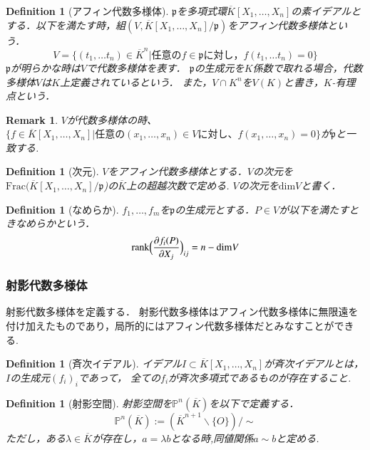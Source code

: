 \documentclass{ujarticle}
\newtheorem{dfn}[thm]{Definition}
\newtheorem*{rem}{Remark}
\begin{document}
\begin{dfn}[アフィン代数多様体]
$\mathfrak{p}$を多項式環$\overline{K}[X_1,\dots,X_n]$の素イデアルとする．以下を満たす時，組$(V,\overline{K}[X_1,\dots,X_n]/\mathfrak{p})$をアフィン代数多様体という．
\begin{equation*}
  V = \{ (t_1, \dots t_n) \in {\overline{K}}^n | \mbox{任意の}f \in \mathfrak{p} \mbox{に対し，}f(t_1, \dots t_n)=0 \}
\end{equation*}
$\mathfrak{p}$が明らかな時は$V$で代数多様体を表す．
$\mathfrak{p}$の生成元を$K$係数で取れる場合，代数多様体$V$は$K$上定義されているという．
また，$V \cap K^n$を$V(K)$と書き，$K$-有理点という．
\end{dfn}
\begin{rem}
 $V$が代数多様体の時、$\{f \in \overline{K}[X_1,\dots,X_n] |
 \mbox{任意の}(x_1,\dots,x_n) \in V \mbox{に対し、}
 f(x_1,\dots,x_n)=0 \}$が$\mathfrak{p}$と一致する.
\end{rem}

\begin{dfn}[次元]
$V$をアフィン代数多様体とする．$V$の次元を
$\mathrm{Frac}(\overline{K}[X_1,\dots,X_n]/\mathfrak{p}$)の$\overline{K}$上の超越次数で定める.
$V$の次元を$\mathrm{dim}V$と書く．
\end{dfn}

\begin{dfn}[なめらか]
  $f_1,\dots,f_m$を$\mathfrak{p}$の生成元とする．$P \in V$が以下を満たすときなめらかという．
  \begin{equation*}
    \mathrm{rank}\Bigl(\frac{ \partial f_i(P)}{ \partial X_j} \Bigr)_{ij} = n - \mathrm{dim}V
  \end{equation*}
\end{dfn}

\subsubsection{射影代数多様体}
\label{subs:射影代数多様体}

射影代数多様体を定義する．
射影代数多様体はアフィン代数多様体に無限遠を付け加えたものであり，局所的にはアフィン代数多様体だとみなすことができる.
\begin{dfn}[斉次イデアル]
イデアル$I\subset \overline{K}[X_1,\dots,X_n]$が斉次イデアルとは，$I$の生成元$(f_i)_i$であって，
全ての$f_i$が斉次多項式であるものが存在すること.
\end{dfn}

\begin{dfn}[射影空間]
射影空間を$\mathbb{P}^n(\overline{K})$を以下で定義する．
\begin{equation*}
  \mathbb{P}^n(\overline{K}):=(\overline{K}^{n+1}\backslash\{O\})/\sim
\end{equation*}
ただし，ある$\lambda \in \overline{K}$が存在し，$a= \lambda b$となる時,同値関係$a \sim b$と定める.
\end{dfn}
\end{document}

